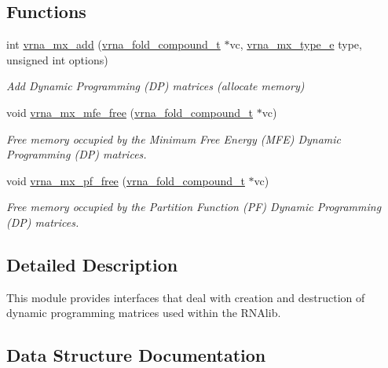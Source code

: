 \subsection*{Functions}
\begin{DoxyCompactItemize}
\item 
int \hyperlink{group__dp__matrices_ga08661f098008961dab0023bf300f0c33}{vrna\+\_\+mx\+\_\+add} (\hyperlink{group__fold__compound_ga1b0cef17fd40466cef5968eaeeff6166}{vrna\+\_\+fold\+\_\+compound\+\_\+t} $\ast$vc, \hyperlink{group__dp__matrices_ga6042ea1d58d01931e959791be6d89343}{vrna\+\_\+mx\+\_\+type\+\_\+e} type, unsigned int options)
\begin{DoxyCompactList}\small\item\em Add Dynamic Programming (DP) matrices (allocate memory) \end{DoxyCompactList}\item 
void \hyperlink{group__dp__matrices_ga6a9422feb5dfe5c64050cebf447672d0}{vrna\+\_\+mx\+\_\+mfe\+\_\+free} (\hyperlink{group__fold__compound_ga1b0cef17fd40466cef5968eaeeff6166}{vrna\+\_\+fold\+\_\+compound\+\_\+t} $\ast$vc)
\begin{DoxyCompactList}\small\item\em Free memory occupied by the Minimum Free Energy (M\+FE) Dynamic Programming (DP) matrices. \end{DoxyCompactList}\item 
void \hyperlink{group__dp__matrices_ga2283e69fd139fb8e58d7ade3b5773f9c}{vrna\+\_\+mx\+\_\+pf\+\_\+free} (\hyperlink{group__fold__compound_ga1b0cef17fd40466cef5968eaeeff6166}{vrna\+\_\+fold\+\_\+compound\+\_\+t} $\ast$vc)
\begin{DoxyCompactList}\small\item\em Free memory occupied by the Partition Function (PF) Dynamic Programming (DP) matrices. \end{DoxyCompactList}\end{DoxyCompactItemize}


\subsection{Detailed Description}
This module provides interfaces that deal with creation and destruction of dynamic programming matrices used within the R\+N\+Alib. 



\subsection{Data Structure Documentation}
\label{structvrna__mx__mfe__s}
\hypertarget{group__dp__matrices_structvrna__mx__mfe__s}{}
